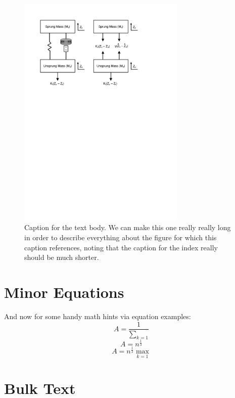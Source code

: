 \begin{figure}[!h]
\begin{singlespace}
\centering
\includegraphics[width=8cm]{Figures/FBD.pdf}
\caption[Caption for the List of Figures.]{Caption for the text body. We can
make this one really really long in order to describe everything
about the figure for which this caption references, noting that
the caption for the index really should be much shorter.}
\label{fig:example}
\end{singlespace}
\end{figure}

\section{Minor Equations}
And now for some handy math hints via equation examples:
\begin{equation}
A=\frac{1}{\displaystyle\sum_{k=1}^{}}
\end{equation}
\begin{equation}
A=n^{\frac{1}{3}}
\end{equation}
\begin{equation}
A=n^{\frac{1}{3}}\max_{k=1}
\end{equation}

\section{Bulk Text}

